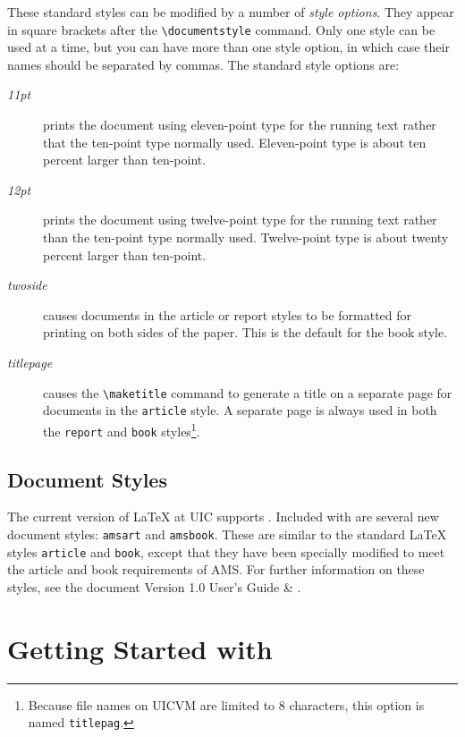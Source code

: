 These standard styles can be modified by a number of
{\em style options\/}.
They appear in square brackets after the \verb+\documentstyle+ command.
Only one style can be used at a time, but you can have more than one
style option, in which case their names should be separated by commas.
The standard style options are:
\begin{description}
 
\item[{\em 11pt}]  prints the document using eleven-point type for the
running text rather that the ten-point type normally used.
Eleven-point type is about ten percent larger than ten-point.
 
\item[{\em 12pt}] prints the document using twelve-point type for
the running text
rather than the ten-point type normally used. Twelve-point type is about
twenty percent larger than ten-point.
 
\item[{\em twoside}] causes documents in the article or report styles
to be formatted for printing on both sides of the paper.
This is the default for the book style.
 
\item[{\em titlepage}] causes the \verb+\maketitle+ command to generate a
title on a separate page for documents in the {\tt article} style.
A separate page is always used in both the {\tt report} and {\tt book}
styles\footnote{Because file names on UICVM are limited to 8
characters, this option is named {\tt titlepag}.}.
\end{description}
\section{\amslatex{} Document Styles}
The current version of \LaTeX{} at UIC supports \amslatex{}.
Included with \amslatex{} are several new document styles:
{\tt amsart} and {\tt amsbook}.
These are similar to the standard \LaTeX{} styles {\tt article} and
{\tt book}, except that they have been specially modified to meet the
article and book requirements of AMS.  For further information on
these styles, see the document {\underl \amslatex{} Version 1.0
User's Guide & }\cite{amsltx}.
 
\chapter{Getting Started with \uicthesi}
 
